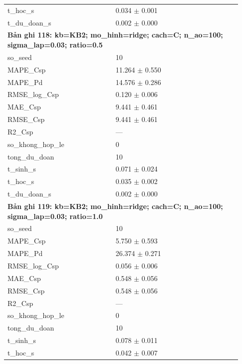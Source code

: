 \begin{longtable}{p{0.43\linewidth}p{0.50\linewidth}}
t\_\allowbreak hoc\_\allowbreak s & 0.034 $\pm$ 0.001 \\
t\_\allowbreak du\_\allowbreak doan\_\allowbreak s & 0.002 $\pm$ 0.000 \\
\midrule
\multicolumn{2}{p{0.95\linewidth}}{\textbf{Bản ghi 118: kb=KB2; mo\_hinh=ridge; cach=C; n\_ao=100; sigma\_lap=0.03; ratio=0.5}} \\
so\_\allowbreak seed & 10 \\
MAPE\_\allowbreak Csp & 11.264 $\pm$ 0.550 \\
MAPE\_\allowbreak Pd & 14.576 $\pm$ 0.286 \\
RMSE\_\allowbreak log\_\allowbreak Csp & 0.120 $\pm$ 0.006 \\
MAE\_\allowbreak Csp & 9.441 $\pm$ 0.461 \\
RMSE\_\allowbreak Csp & 9.441 $\pm$ 0.461 \\
R2\_\allowbreak Csp & — \\
so\_\allowbreak khong\_\allowbreak hop\_\allowbreak le & 0 \\
tong\_\allowbreak du\_\allowbreak doan & 10 \\
t\_\allowbreak sinh\_\allowbreak s & 0.071 $\pm$ 0.024 \\
t\_\allowbreak hoc\_\allowbreak s & 0.035 $\pm$ 0.002 \\
t\_\allowbreak du\_\allowbreak doan\_\allowbreak s & 0.002 $\pm$ 0.000 \\
\midrule
\multicolumn{2}{p{0.95\linewidth}}{\textbf{Bản ghi 119: kb=KB2; mo\_hinh=ridge; cach=C; n\_ao=100; sigma\_lap=0.03; ratio=1.0}} \\
so\_\allowbreak seed & 10 \\
MAPE\_\allowbreak Csp & 5.750 $\pm$ 0.593 \\
MAPE\_\allowbreak Pd & 26.374 $\pm$ 0.271 \\
RMSE\_\allowbreak log\_\allowbreak Csp & 0.056 $\pm$ 0.006 \\
MAE\_\allowbreak Csp & 0.548 $\pm$ 0.056 \\
RMSE\_\allowbreak Csp & 0.548 $\pm$ 0.056 \\
R2\_\allowbreak Csp & — \\
so\_\allowbreak khong\_\allowbreak hop\_\allowbreak le & 0 \\
tong\_\allowbreak du\_\allowbreak doan & 10 \\
t\_\allowbreak sinh\_\allowbreak s & 0.078 $\pm$ 0.011 \\
t\_\allowbreak hoc\_\allowbreak s & 0.042 $\pm$ 0.007 \\

\end{longtable}
